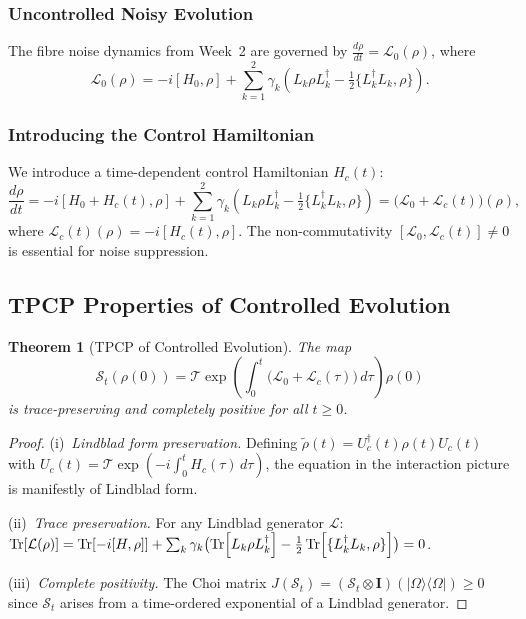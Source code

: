 \documentclass[12pt,a4paper]{article}
\theoremstyle{definition}
\theoremstyle{plain}
\newtheorem{theorem}{Theorem}[section]
\newcommand{\tensor}{\otimes}
\begin{document}
\subsubsection{Uncontrolled Noisy Evolution}

The fibre noise dynamics from Week~2 are governed by $\frac{d\rho}{dt}=\mathcal{L}_0(\rho)$,
where
\begin{equation}
\mathcal{L}_0(\rho)=-i[H_0,\rho]+\sum_{k=1}^2\gamma_k\!\left(L_k\rho L_k^\dagger-\tfrac{1}{2}\{L_k^\dagger L_k,\rho\}\right).
\label{eq:uncontrolled}
\end{equation}

\subsubsection{Introducing the Control Hamiltonian}

We introduce a time-dependent control Hamiltonian $H_c(t)$:
\begin{equation}
\frac{d\rho}{dt}=-i[H_0+H_c(t),\rho]+\sum_{k=1}^2\gamma_k\!\left(L_k\rho L_k^\dagger-\tfrac{1}{2}\{L_k^\dagger L_k,\rho\}\right)=\bigl(\mathcal{L}_0+\mathcal{L}_c(t)\bigr)(\rho),
\label{eq:controlled}
\end{equation}
where $\mathcal{L}_c(t)(\rho)=-i[H_c(t),\rho]$. The non-commutativity $[\mathcal{L}_0,\mathcal{L}_c(t)]\ne0$
is essential for noise suppression.

\subsection{TPCP Properties of Controlled Evolution}

\begin{theorem}[TPCP of Controlled Evolution]
The map
\begin{equation}
\mathcal{S}_t(\rho(0))=\mathcal{T}\!\exp\!\left(\int_0^t\!\bigl(\mathcal{L}_0+\mathcal{L}_c(\tau)\bigr)\,d\tau\right)\!\rho(0)
\label{eq:controlled_evolution}
\end{equation}
is trace-preserving and completely positive for all $t\ge0$.
\end{theorem}

\begin{proof}
(i)~\textit{Lindblad form preservation.} Defining $\tilde\rho(t)=U_c^\dagger(t)\rho(t)U_c(t)$
with $U_c(t)=\mathcal{T}\exp(-i\int_0^t H_c(\tau)\,d\tau)$, the equation in the interaction
picture is manifestly of Lindblad form.

(ii)~\textit{Trace preservation.} For any Lindblad generator $\mathcal{L}$:
$\Tr[\mathcal{L}(\rho)]=\Tr[-i[H,\rho]]+\sum_k\gamma_k\bigl(\Tr[L_k\rho L_k^\dagger]-\tfrac{1}{2}\Tr[\{L_k^\dagger L_k,\rho\}]\bigr)=0$.

(iii)~\textit{Complete positivity.} The Choi matrix $J(\mathcal{S}_t)=(\mathcal{S}_t\tensor\mathbf{I})(|\Omega\rangle\langle\Omega|)\ge0$
since $\mathcal{S}_t$ arises from a time-ordered exponential of a Lindblad generator.
\end{proof}
\end{document}

